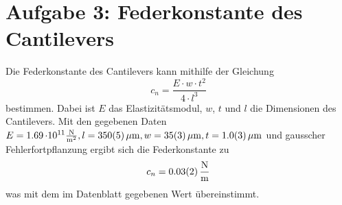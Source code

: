 \section{Aufgabe 3: Federkonstante des Cantilevers}
Die Federkonstante des Cantilevers kann mithilfe der Gleichung $$c_n = \frac{E\cdot w\cdot t^2}{4 \cdot l^3}$$ bestimmen. Dabei ist $E$ das Elastizitätsmodul, $w$, $t$ und $l$ die Dimensionen des Cantilevers. 
Mit den gegebenen Daten $E = \SI{1.69 }{\cdot 10^{11}\frac{N}{m^2}}, l = \SI{350 \pm 5}{\mu m}, w = \SI{35 \pm 3}{\mu m}, t = \SI{1 \pm 0.3}{\mu m}$ und gausscher Fehlerfortpflanzung ergibt sich die Federkonstante zu
$$c_n = \SI{0.03 \pm 0.02}{\frac{N}{m}}$$
was mit dem im Datenblatt gegebenen Wert übereinstimmt. 